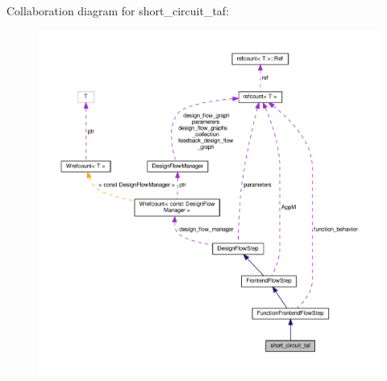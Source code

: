 Collaboration diagram for short\+\_\+circuit\+\_\+taf\+:
\nopagebreak
\begin{figure}[H]
\begin{center}
\leavevmode
\includegraphics[width=350pt]{d4/df1/classshort__circuit__taf__coll__graph}
\end{center}
\end{figure}
